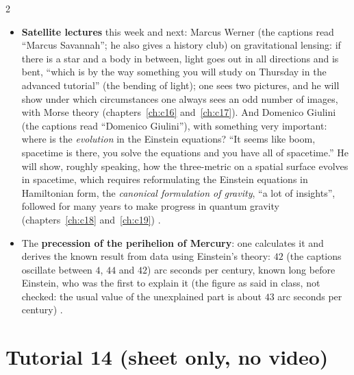 \begin{paracol}{2}
\begin{itemize}
  \item \textbf{Satellite lectures} this week and next: Marcus Werner (the captions read ``Marcus Savannah''; he also gives a history club) on gravitational lensing: if there is a star and a body in between, light goes out in all directions and is bent, ``which is by the way something you will study on Thursday in the advanced tutorial'' (the bending of light); one sees two pictures, and he will show under which circumstances one always sees an odd number of images, with Morse theory (chapters~\ref{ch:c16} and~\ref{ch:c17}). And Domenico Giulini (the captions read ``Domenico Giulini''), with something very important: where is the \emph{evolution} in the Einstein equations? ``It seems like boom, spacetime is there, you solve the equations and you have all of spacetime.'' He will show, roughly speaking, how the three-metric on a spatial surface evolves in spacetime, which requires reformulating the Einstein equations in Hamiltonian form, the \emph{canonical formulation of gravity}, ``a lot of insights'', followed for many years to make progress in quantum gravity (chapters~\ref{ch:c18} and~\ref{ch:c19}) .
  \item The \textbf{precession of the perihelion of Mercury}: one calculates it and derives the known result from data using Einstein's theory: $42$ (the captions oscillate between $4$, $44$ and $42$) arc seconds per century, known long before Einstein, who was the first to explain it (the figure as said in class, not checked: the usual value of the unexplained part is about $43$ arc seconds per century) .
\end{itemize}

\section{Tutorial 14 (sheet only, no video)}\label{sec:t15-1}


\end{paracol}
